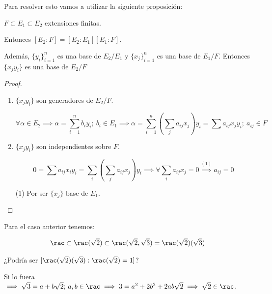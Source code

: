 \documentclass{apuntes}
\begin{document}
Para resolver esto vamos a utilizar la siguiente proposición:

\begin{prop}
$F \subset E_1 \subset E_2$ extensiones finitas.

Entonces $[E_2 : F] = [E_2 : E_1][E_1 : F]$.

Además, $\{y_i\}_{i=1}^n$ es una base de $E_2 / E_1$ y $\{x_j\}_{i=1}^n$  es una base de $E_1 / F$. Entonces $\{x_jy_i\}$ es una base de $E_2/F$
\end{prop}

\begin{proof}
\begin{enumerate}
\item $\{x_jy_i\}$ son generadores de $E_2 / F$.

$$\forall \alpha \in E_2 \implies \alpha = \sum_{i=1}^n b_iy_i; \ b_i\in E_1 \implies \alpha = \sum_{i=1}^n \left(\sum_j a_{ij}x_j\right) y_i = \sum a_{ij}x_jy_i; \ a_{ij}\in F$$

\item $\{x_jy_i\}$ son independientes sobre $F$.

\[0 = \sum a_{ij}x_iy_i = \sum_i \left(\sum_j a_{ij}x_j\right)y_i \implies \forall \sum_i a_{ij}x_j = 0 \overset{(1)}{\implies} a_{ij} = 0
\]

(1) Por ser $\{x_j\}$ base de $E_1$.
\end{enumerate}
\end{proof}


Para el caso anterior tenemos:

\[
\rac \subset \rac(\sqrt{2}) \subset \rac(\sqrt{2},\sqrt{3}) = \rac(\sqrt{2})(\sqrt{3})
\]

¿Podría ser $[\rac(\sqrt{2})(\sqrt{3}): \rac(\sqrt{2}) = 1 ]$?

Si lo fuera $\implies \sqrt{3} = a+b\sqrt{2} ;\, a,b\in\rac \implies 3=a^2+2b^2+2ab\sqrt{2} \implies \sqrt{2}\in \rac$.
\end{document}

